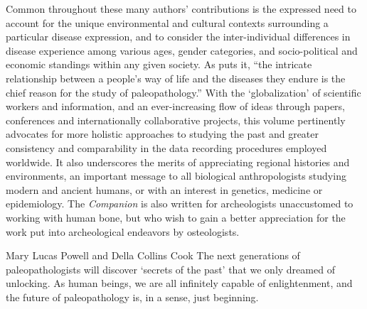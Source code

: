 Common throughout these many authors’ contributions is the expressed need to account for the unique environmental and cultural contexts surrounding a particular disease expression, and to consider the inter-individual differences in disease experience among various ages, gender categories, and socio-political and economic standings within any given society.
As \textcite[18]{Wells1964} puts it, “the intricate relationship between a people’s way of life and the diseases they endure is the chief reason for the study of paleopathology.”
With the ‘globalization’ of scientific workers and information, and an ever-increasing flow of ideas through papers, conferences and internationally collaborative projects, this volume pertinently advocates for more holistic approaches to studying the past and greater consistency and comparability in the data recording procedures employed worldwide.
It also underscores the merits of appreciating regional histories and environments, an important message to all biological anthropologists studying modern and ancient humans, or with an interest in genetics, medicine or epidemiology.
The \textit{Companion} is also written for archeologists unaccustomed to working with human bone, but who wish to gain a better appreciation for the work put into archeological endeavors by osteologists.

\begin{IJSRAquote}{Mary Lucas Powell and Della Collins Cook\footnotemark}
The next generations of paleopathologists will discover ‘secrets of the past’ that we only dreamed of unlocking. As human beings, we are all infinitely capable of enlightenment, and the future of paleopathology is, in a sense, just beginning.
\end{IJSRAquote}
\IJSRAclosing%
%
